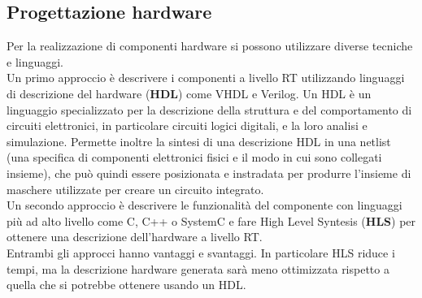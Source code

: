 \documentclass[]{IEEEtran}
\begin{document}
\subsection{Progettazione hardware}
Per la realizzazione di componenti hardware si possono utilizzare diverse tecniche e linguaggi.
\\Un primo approccio è descrivere i componenti a livello RT utilizzando linguaggi di descrizione del hardware (\textbf{HDL}) come VHDL e Verilog. Un HDL è un linguaggio specializzato per la descrizione della struttura e del comportamento di circuiti elettronici, in particolare circuiti logici digitali, e la loro analisi e simulazione. Permette inoltre la sintesi di una descrizione HDL in una netlist (una specifica di componenti elettronici fisici e il modo in cui sono collegati insieme), che può quindi essere posizionata e instradata per produrre l'insieme di maschere utilizzate per creare un circuito integrato\cite{HDL}.
\\Un secondo approccio è descrivere le funzionalità del componente con linguaggi più ad alto livello come C, C++ o SystemC\cite{SystemC} e fare High Level Syntesis\cite{HLS} (\textbf{HLS}) per ottenere una descrizione dell'hardware a livello RT.
\\Entrambi gli approcci hanno vantaggi e svantaggi. In particolare HLS riduce i tempi, ma la descrizione hardware generata sarà meno ottimizzata rispetto a quella che si potrebbe ottenere usando un HDL.
\end{document}
